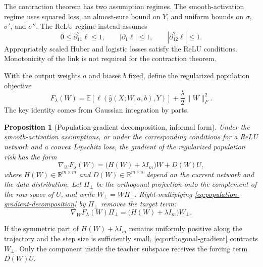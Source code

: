 \documentclass[11pt,twoside]{article}
\newcommand{\E}{\mathbb E}
\newcommand{\R}{\mathbb R}
\newtheorem{proposition}[theorem]{Proposition}
\theoremstyle{definition}
\theoremstyle{remark}
\begin{document}
The contraction theorem has two assumption regimes. The smooth-activation
regime uses squared loss, an almost-sure bound on \(Y\), and uniform bounds on
\(\sigma\), \(\sigma'\), and \(\sigma''\). The ReLU regime instead assumes
\begin{equation}
 0\leq\partial_{11}^2\ell\leq1,
 \qquad |\partial_1\ell|\leq1,
 \qquad |\partial_{12}^2\ell|\leq1.
 \label{eq:mousavi-loss-assumptions}
\end{equation}
Appropriately scaled Huber and logistic losses satisfy the ReLU conditions.
Monotonicity of the link is not required for the contraction theorem.

With the output weights $a$ and biases $b$ fixed, define the regularized
population objective
\[
 F_\lambda(W)=\E[\ell(\widehat y(X;W,a,b),Y)]
              +\frac\lambda2\|W\|_F^2.
\]
The key identity comes from Gaussian integration by parts.
\begin{proposition}[Population-gradient decomposition, informal form]
Under the smooth-activation assumptions, or under the corresponding
conditions for a ReLU network and a convex Lipschitz loss, the gradient of the
regularized population risk has the form
\begin{equation}
 \nabla_W F_\lambda(W)
   =\bigl(H(W)+\lambda I_m\bigr)W+D(W)U,
 \label{eq:population-gradient-decomposition}
\end{equation}
where \(H(W)\in\R^{m\times m}\) and \(D(W)\in\R^{m\times s}\) depend on the
current network and the data distribution. Let \(\Pi_\perp\) be the
orthogonal projection onto the complement of the row space of \(U\), and
write \(W_\perp=W\Pi_\perp\). Right-multiplying
\cref{eq:population-gradient-decomposition} by \(\Pi_\perp\) removes the target
term:
\begin{equation}
 \nabla_W F_\lambda(W)\Pi_\perp
 =\bigl(H(W)+\lambda I_m\bigr)W_\perp.
 \label{eq:orthogonal-gradient}
\end{equation}
\end{proposition}
If the symmetric part of \(H(W)+\lambda I_m\) remains uniformly positive
along the trajectory and the step size is sufficiently small,
\cref{eq:orthogonal-gradient} contracts \(W_\perp\). Only the component inside
the teacher subspace receives the forcing term \(D(W)U\).
\end{document}
